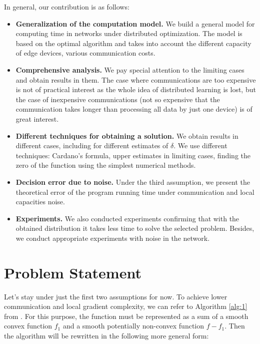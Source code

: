 \documentclass{article}
\theoremstyle{definition}
\theoremstyle{plain}
\begin{document}
In general, our contribution is as follows:
\begin{itemize}
    \item \textbf{Generalization of the computation model.} We build a general model for computing time in networks under distributed optimization. The model is based on the optimal algorithm \cite{kovalev2022optimal} and takes into account the different capacity of edge devices, various communication costs.
    \item \textbf{Comprehensive analysis.} We pay special attention to the limiting cases and obtain results in them. The case where communications are too expensive is not of practical interest as the whole idea of distributed learning is lost, but the case of inexpensive communications (not so expensive that the communication takes longer than processing all data by just one device) is of great interest. 
    \item \textbf{Different techniques for obtaining a solution.} We obtain results in different cases, including for different estimates of $\delta$. We use different techniques: Cardano's formula, upper estimates in limiting cases, finding the zero of the function using the simplest numerical methods.
    \item \textbf{Decision error due to noise.} Under the third assumption, we present the theoretical error of the program running time under communication and local capacities noise.
    \item \textbf{Experiments.} We also conducted experiments confirming that with the obtained distribution it takes less time to solve the selected problem. Besides, we conduct appropriate experiments with noise in the network.
\end{itemize}

\section{Problem Statement}

Let's stay under just the first two assumptions for now. To achieve lower communication and local gradient complexity, we can refer to Algorithm \ref{alg:1} from \cite{kovalev2022optimal}. For this purpose, the function must be represented as a sum of a smooth convex function $f_1$ and a smooth potentially non-convex function $f - f_1$. Then the algorithm will be rewritten in the following more general form:
\end{document}
